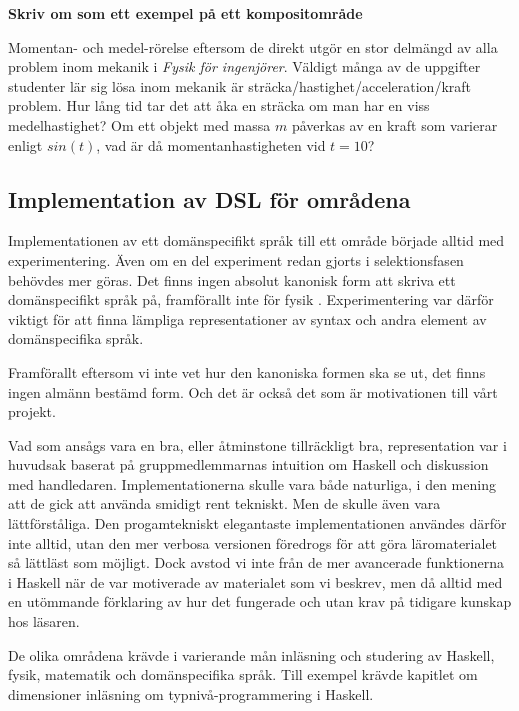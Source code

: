 \begin{binge}
\textbf{Skriv om som ett exempel på ett kompositområde}

Momentan- och medel-rörelse eftersom de direkt utgör en stor delmängd
av alla problem inom mekanik i \textit{Fysik för ingenjörer}. Väldigt många av
de uppgifter studenter lär sig lösa inom mekanik är
sträcka/hastighet/acceleration/kraft problem. Hur lång tid tar det att åka en
sträcka om man har en viss medelhastighet? Om ett objekt med massa $m$
påverkas av en kraft som varierar enligt $sin(t)$, vad är då
momentanhastigheten vid $t=10$?

\subsection{Implementation av DSL för områdena}

Implementationen av ett domänspecifikt språk till ett område började alltid med
experimentering. Även om en del experiment redan gjorts i selektionsfasen
behövdes mer göras. Det finns ingen absolut kanonisk form  att skriva ett domänspecifikt språk på, framförallt inte för
fysik . Experimentering var därför viktigt för att finna
lämpliga representationer av syntax och andra element av domänspecifika språk.

Framförallt eftersom vi inte vet hur den kanoniska formen ska se ut, det finns
ingen almänn bestämd form. Och det är också det som är motivationen till vårt
projekt. 

Vad som ansågs vara en bra, eller åtminstone tillräckligt bra, representation
var i huvudsak baserat på gruppmedlemmarnas intuition om Haskell och diskussion
med handledaren. Implementationerna skulle vara både naturliga, i den mening
att de gick att använda smidigt rent tekniskt. Men de skulle även vara
lättförståliga. Den progamtekniskt elegantaste implementationen användes därför
inte alltid, utan den mer verbosa versionen föredrogs för att göra
läromaterialet så lättläst som möjligt. Dock avstod vi inte från de mer
avancerade funktionerna i Haskell när de var motiverade av materialet som vi
beskrev, men då alltid med en utömmande förklaring av hur det fungerade och utan
krav på tidigare kunskap hos läsaren.

De olika områdena krävde i varierande mån inläsning och studering av Haskell,
fysik, matematik och domänspecifika språk. Till exempel krävde kapitlet om
dimensioner inläsning om typnivå-programmering i Haskell. 


\end{binge}
